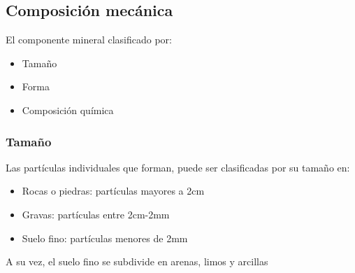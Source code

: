 \subsection{Composición mecánica}

El componente mineral clasificado por:
\begin{itemize}
    \item Tamaño
    \item Forma
    \item Composición química
\end{itemize}

\subsubsection{Tamaño}
Las partículas individuales que forman, puede ser clasificadas por su tamaño en:
\begin{itemize}
    \item Rocas o piedras: partículas mayores a 2cm
    \item Gravas: partículas entre 2cm-2mm
    \item Suelo fino: partículas menores de 2mm
\end{itemize}
A su vez, el suelo fino se subdivide en arenas, limos y arcillas
